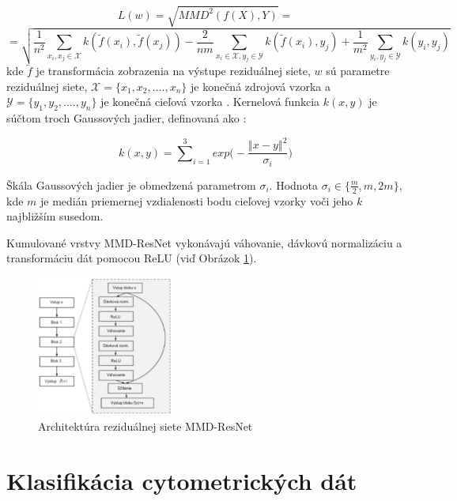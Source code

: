 \begin{equation}
    L(w) = \sqrt{MMD^2(f(X), Y)} = 
\end{equation}
\[
= \sqrt{\frac{1}{n^2}\sum_{x_i, x_j \in \mathcal{X}}^{}{k(\tilde{f}(x_i),\tilde{f}(x_j))} - 
\frac{2}{nm}\sum_{x_i \in \mathcal{X}, y_j \in \mathcal{Y}}^{}{k(\tilde{f}(x_i),y_j)} +
\frac{1}{m^2}\sum_{y_i, y_j \in \mathcal{Y}}^{}{k(y_i,y_j)}
}
\]
kde $\tilde{f}$ je transformácia zobrazenia na výstupe reziduálnej siete, $w$ sú parametre reziduálnej siete, $\mathcal{X} = \{x_1, x_2, .... , x_n\}$ je konečná zdrojová vzorka a $\mathcal{Y} = \{y_1, y_2, .... , y_n\}$ je konečná cieľová vzorka \cite{Li2017}. Kernelová funkcia $k(x, y)$ je súčtom troch Gaussových jadier, definovaná ako \cite{Li2017}:

\begin{equation}
k(x,y) = {\sum^3}_{i=1}exp\bigg(-\frac{{\left\Vert x-y \right\Vert}^2}{\sigma_i}\bigg)
\end{equation}

Škála Gaussových jadier je obmedzená parametrom $\sigma_i$. Hodnota $\sigma_i \in \{\frac{m}{2}, m, 2m\}$, kde $m$ je medián priemernej vzdialenosti bodu cieľovej vzorky voči jeho $k$ najbližším susedom.

Kumulované vrstvy MMD-ResNet vykonávajú váhovanie, dávkovú normalizáciu a transformáciu dát pomocou ReLU (viď Obrázok \ref{MMD-ResNet_arch}). 

\begin{figure}
\centerline{\includegraphics[width=0.4\textwidth]{images/MMD-ResNet_arch.png}}
\caption[Architektúra MMD-ResNet]{Architektúra reziduálnej siete MMD-ResNet}
\label{MMD-ResNet_arch}
\end{figure}



\section{Klasifikácia cytometrických dát}

